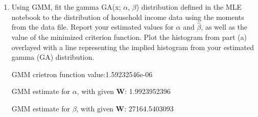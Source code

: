 \documentclass[letterpaper,12pt]{article}
\theoremstyle{definition}
\begin{document}
\begin{enumerate}
\begin{enumerate}
\item Using GMM, fit the gamma GA(x; $\alpha$, $\beta$) distribution defined in the MLE notebook to the distribution of household income data using the moments from the data file. Report your estimated values for $\hat{\alpha}$  and  $\hat{\beta}$, as well as the value of the minimized criterion function. Plot the histogram from part (a) overlayed with a line representing the implied histogram from your estimated gamma (GA) distribution.
\par
\begin{figure}[H]\centering\captionsetup{width=4.0in}
\end{figure}
\par
GMM crietron function value:1.59232546e-06\par
GMM estimate for $\alpha$, with given $\textbf{W}$: 1.9923952396 \par
GMM estimate for $\beta$, with given $\textbf{W}$: 27164.5403093\par
\bigskip


\end{enumerate}
\end{enumerate}
\end{document}
